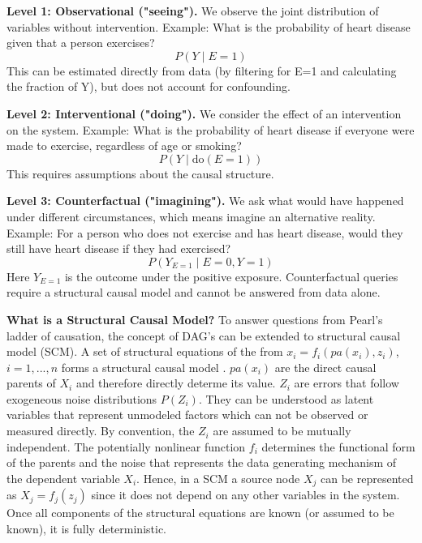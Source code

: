 \textbf{Level 1: Observational ("seeing").}  
We observe the joint distribution of variables without intervention.  
Example: What is the probability of heart disease given that a person exercises?  
\[
P(Y \mid E = 1)
\]
This can be estimated directly from data (by filtering for E=1 and calculating the fraction of Y), but does not account for confounding.


\textbf{Level 2: Interventional ("doing").}  
We consider the effect of an intervention on the system.  
Example: What is the probability of heart disease if everyone were made to exercise, regardless of age or smoking?  
\[
P(Y \mid \text{do}(E = 1))
\]
This requires assumptions about the causal structure.


\textbf{Level 3: Counterfactual ("imagining").}  
We ask what would have happened under different circumstances, which means imagine an alternative reality.
Example: For a person who does not exercise and has heart disease, would they still have heart disease if they had exercised?  
\[
P(Y_{E=1} \mid E = 0, Y = 1)
\]
Here $Y_{E=1}$ is the outcome under the positive exposure. Counterfactual queries require a structural causal model and cannot be answered from data alone.






\textbf{What is a Structural Causal Model?}
To answer questions from Pearl's ladder of causation, the concept of DAG's can be extended to structural causal model (SCM). A set of structural equations of the from $x_i = f_i(pa(x_i), z_i)$, $i=1,...,n$ forms a structural causal model \citep{pearl_book2009}. $pa(x_i)$ are the direct causal parents of $X_i$ and therefore directly determe its value. $Z_i$ are errors that follow exogeneous noise distributions $P(Z_i)$. They can be understood as latent variables that represent unmodeled factors which can not be observed or measured directly. By convention, the $Z_i$ are assumed to be mutually independent. %
The potentially nonlinear function $f_i$ determines the functional form of the parents and the noise that represents the data generating mechanism of the dependent variable $X_i$. Hence, in a SCM a source node $X_j$ can be represented as $X_j = f_j(z_j)$ since it does not depend on any other variables in the system. Once all components of the structural equations are known (or assumed to be known), it is fully deterministic. 

